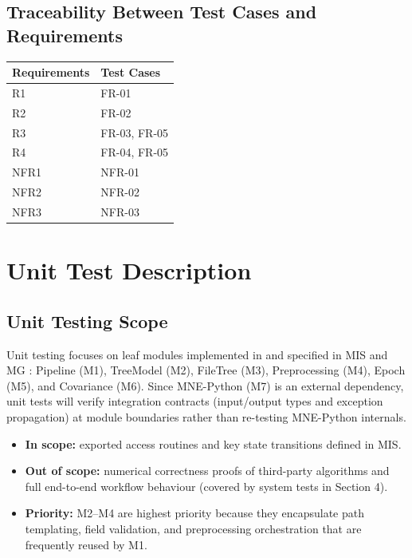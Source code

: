 \documentclass[12pt, titlepage]{article}
\begin{document}
\subsection{Traceability Between Test Cases and Requirements}


\begin{table}[h]
\centering
\begin{tabularx}{0.6\textwidth}{p{3cm}X}
\toprule
    \textbf{Requirements} & \textbf{Test Cases} \\
\midrule
    R1 & FR-01 \\
    R2 & FR-02 \\
    R3 & FR-03, FR-05 \\
    R4 & FR-04, FR-05 \\
    NFR1 & NFR-01 \\
    NFR2 & NFR-02 \\
    NFR3 & NFR-03 \\
\bottomrule
\end{tabularx}
\end{table}




\newpage








\section{Unit Test Description} \label{unit_test_description}




\subsection{Unit Testing Scope}


\noindent Unit testing focuses on leaf modules implemented in \progname{} and specified in MIS \citep{MIS} and MG \citep{MG}: Pipeline (M1), TreeModel (M2), FileTree (M3), Preprocessing (M4), Epoch (M5), and Covariance (M6). Since MNE-Python (M7) is an external dependency, unit tests will verify integration contracts (input/output types and exception propagation) at module boundaries rather than re-testing MNE-Python internals.

\begin{itemize}
    \item \textbf{In scope:} exported access routines and key state transitions defined in MIS.
    \item \textbf{Out of scope:} numerical correctness proofs of third-party algorithms and full end-to-end workflow behaviour (covered by system tests in Section 4).
    \item \textbf{Priority:} M2--M4 are highest priority because they encapsulate path templating, field validation, and preprocessing orchestration that are frequently reused by M1.
\end{itemize}
\end{document}
